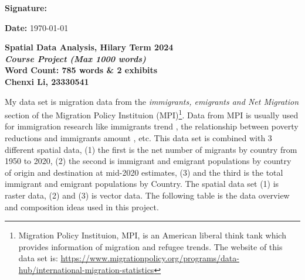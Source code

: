 \documentclass[12pt]{article} %
\begin{document}
\vspace{.7cm}


\begin{flushleft}
	\begin{minipage}{0.5\linewidth}
		\textbf{Signature:}
	\end{minipage}
\end{flushleft}

\vspace{.3cm}

\noindent \textbf{Date: } \today

\newpage
\begin{center}
	\textbf{Spatial Data Analysis, Hilary Term 2024}\\
	\textbf{\textit{Course Project (Max 1000 words)}} \\
	\textbf{Word Count: 785 words \& 2 exhibits} \\
	\vspace{.3cm}
	\textbf{Chenxi Li, 23330541}
\end{center}

\vspace{.5cm}

\noindent My data set is migration data from the \textit{immigrants, emigrants and Net Migration} section of the Migration Policy Instituion (MPI)\footnote[1]{Migration Policy Instituion, MPI, is an American liberal think tank which provides information of migration and refugee trends. The website of this data set is: \url{https://www.migrationpolicy.org/programs/data-hub/international-migration-statistics}}. Data from MPI is usually used for immigration research like immigrants trend \citep{stalker2002migration, helbling2018migration}, the relationship between poverty reductions and immigrants amount \citep{newland2004beyond}, etc. This data set is combined with 3 different spatial data, (1) the first is the net number of migrants by country from 1950 to 2020, (2) the second is immigrant and emigrant populations by country of origin and destination at mid-2020 estimates, (3) and the third is the total immigrant and emigrant populations by Country. The spatial data set (1) is raster data, (2) and (3) is vector data. The following table is the data overview and composition ideas used in this project.
\end{document}
